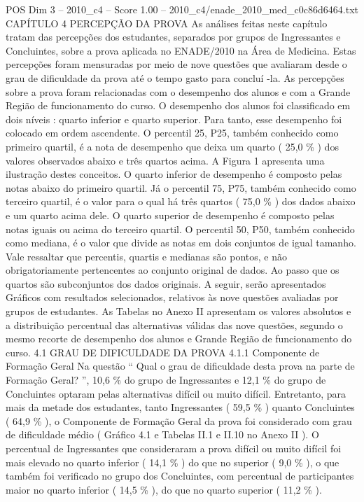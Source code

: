 \begin{textsample}{POS Dim 3 – 2010\_c4 – Score 1.00 – 2010\_c4/enade\_2010\_med\_c0c86d6464.txt}  \label{ex:f3_pos_141}
CAPÍTULO 4 PERCEPÇÃO DA PROVA As análises feitas neste capítulo tratam das percepções dos estudantes, separados por grupos de Ingressantes e Concluintes, sobre a prova aplicada no ENADE/2010 na Área de Medicina.
Estas percepções foram mensuradas por meio de nove questões que avaliaram desde o grau de dificuldade da prova até o tempo gasto para concluí -la.
As percepções sobre a prova foram relacionadas com o desempenho dos alunos e com a Grande Região de funcionamento do curso.
O desempenho dos alunos foi classificado em dois níveis : quarto inferior e quarto superior.
Para tanto, esse desempenho foi colocado em ordem ascendente.
O percentil 25, P25, também conhecido como primeiro quartil, é a nota de desempenho que deixa um quarto ( 25,0 \% ) dos valores observados abaixo e três quartos acima.
A Figura 1 apresenta uma ilustração destes conceitos.
O quarto inferior de desempenho é composto pelas notas abaixo do primeiro quartil.
Já o percentil 75, P75, também conhecido como terceiro quartil, é o valor para o qual há três quartos ( 75,0 \% ) dos dados abaixo e um quarto acima dele.
O quarto superior de desempenho é composto pelas notas iguais ou acima do terceiro quartil.
O percentil 50, P50, também conhecido como mediana, é o valor que divide as notas em dois conjuntos de igual tamanho.
Vale ressaltar que percentis, quartis e medianas são pontos, e não obrigatoriamente pertencentes ao conjunto original de dados.
Ao passo que os quartos são subconjuntos dos dados originais.
A seguir, serão apresentados Gráficos com resultados selecionados, relativos às nove questões avaliadas por grupos de estudantes.
As Tabelas no Anexo II apresentam os valores absolutos e a distribuição percentual das alternativas válidas das nove questões, segundo o mesmo recorte de desempenho dos alunos e Grande Região de funcionamento do curso. 4.1 GRAU DE DIFICULDADE DA PROVA 4.1.1 Componente de Formação Geral Na questão “ Qual o grau de dificuldade desta prova na parte de Formação Geral? ”, 10,6 \% do grupo de Ingressantes e 12,1 \% do grupo de Concluintes optaram pelas alternativas difícil ou muito difícil.
Entretanto, para mais da metade dos estudantes, tanto Ingressantes ( 59,5 \% ) quanto Concluintes ( 64,9 \% ), o Componente de Formação Geral da prova foi considerado com grau de dificuldade médio ( Gráfico 4.1 e Tabelas II.1 e II.10 no Anexo II ).
O percentual de Ingressantes que consideraram a prova difícil ou muito difícil foi mais elevado no quarto inferior ( 14,1 \% ) do que no superior ( 9,0 \% ), o que também foi verificado no grupo dos Concluintes, com percentual de participantes maior no quarto inferior ( 14,5 \% ), do que no quarto superior ( 11,2 \% ).

\end{textsample}
